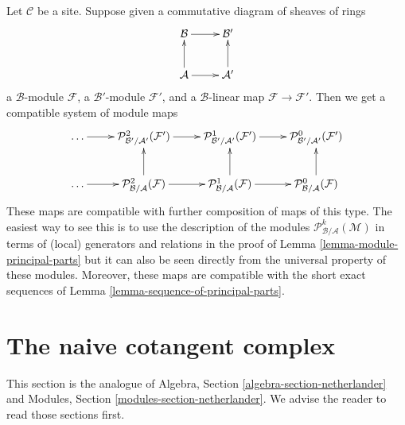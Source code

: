\begin{remark}
\label{remark-functoriality-principal-parts}
Let $\mathcal{C}$ be a site. Suppose given a commutative diagram of
sheaves of rings
$$
\xymatrix{
\mathcal{B} \ar[r] & \mathcal{B}' \\
\mathcal{A} \ar[u] \ar[r] & \mathcal{A}' \ar[u]
}
$$
a $\mathcal{B}$-module $\mathcal{F}$, a $\mathcal{B}'$-module $\mathcal{F}'$,
and a $\mathcal{B}$-linear map $\mathcal{F} \to \mathcal{F}'$.
Then we get a compatible system of module maps
$$
\xymatrix{
\ldots \ar[r] &
\mathcal{P}^2_{\mathcal{B}'/\mathcal{A}'}(\mathcal{F}') \ar[r] &
\mathcal{P}^1_{\mathcal{B}'/\mathcal{A}'}(\mathcal{F}') \ar[r] &
\mathcal{P}^0_{\mathcal{B}'/\mathcal{A}'}(\mathcal{F}') \\
\ldots \ar[r] &
\mathcal{P}^2_{\mathcal{B}/\mathcal{A}}(\mathcal{F}) \ar[r] \ar[u] &
\mathcal{P}^1_{\mathcal{B}/\mathcal{A}}(\mathcal{F}) \ar[r] \ar[u] &
\mathcal{P}^0_{\mathcal{B}/\mathcal{A}}(\mathcal{F}) \ar[u]
}
$$
These maps are compatible with further composition of maps of this type.
The easiest way to see this is to use the description of the modules
$\mathcal{P}^k_{\mathcal{B}/\mathcal{A}}(\mathcal{M})$ in terms of
(local) generators and relations in the proof of
Lemma \ref{lemma-module-principal-parts} but it can also be seen
directly from the universal
property of these modules. Moreover, these maps are compatible with
the short exact sequences of Lemma \ref{lemma-sequence-of-principal-parts}.
\end{remark}








\section{The naive cotangent complex}
\label{section-netherlander}

\noindent
This section is the analogue of
Algebra, Section \ref{algebra-section-netherlander}
and
Modules, Section \ref{modules-section-netherlander}.
We advise the reader to read those sections first.

